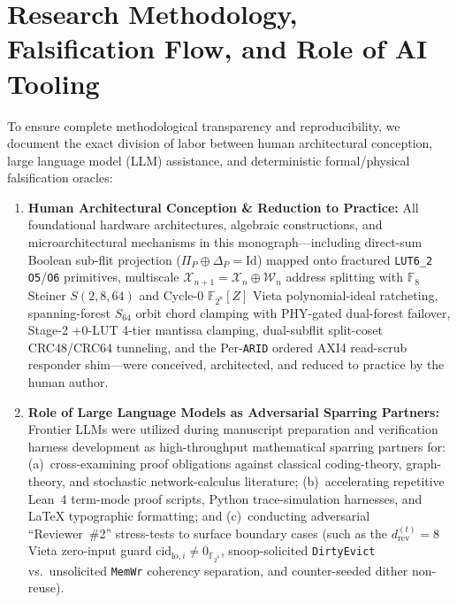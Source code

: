 \documentclass[10pt,twocolumn]{article}
\theoremstyle{spectralthm}
\begin{document}
\section*{Research Methodology, Falsification Flow, and Role of AI Tooling}
To ensure complete methodological transparency and reproducibility, we document the exact division of labor between human architectural conception, large language model (LLM) assistance, and deterministic formal/physical falsification oracles:
\begin{enumerate}
  \item \textbf{Human Architectural Conception \& Reduction to Practice:} All foundational hardware architectures, algebraic constructions, and microarchitectural mechanisms in this monograph---including direct-sum Boolean sub-flit projection ($\Pi_P \oplus \Delta_P = \mathrm{Id}$) mapped onto fractured \mbox{\texttt{LUT6\_2}} \texttt{O5}/\texttt{O6} primitives, multiscale $\mathcal{X}_{n+1} = \mathcal{X}_n \oplus \mathcal{W}_n$ address splitting with $\mathbb{F}_8$ Steiner $S(2,8,64)$ and Cycle-0 $\mathbb{F}_{2^8}[Z]$ Vieta polynomial-ideal ratcheting, spanning-forest $S_{64}$ orbit chord clamping with PHY-gated dual-forest failover, Stage-2 $+0$-LUT 4-tier mantissa clamping, dual-subflit split-coset CRC48/CRC64 tunneling, and the Per-\texttt{ARID} ordered AXI4 read-scrub responder shim---were conceived, architected, and reduced to practice by the human author.
  \item \textbf{Role of Large Language Models as Adversarial Sparring Partners:} Frontier LLMs were utilized during manuscript preparation and verification harness development as high-throughput mathematical sparring partners for: (a)~cross-examining proof obligations against classical coding-theory, graph-theory, and stochastic network-calculus literature; (b)~accelerating repetitive Lean~4 term-mode proof scripts, Python trace-simulation harnesses, and LaTeX typographic formatting; and (c)~conducting adversarial ``Reviewer~\#2'' stress-tests to surface boundary cases (such as the $d_{\mathrm{rev}}^{(t)} = 8$ Vieta zero-input guard $\mathrm{cid}_{\mathrm{lo},i} \neq 0_{\mathbb{F}_{2^8}}$, snoop-solicited \texttt{DirtyEvict} vs.\ unsolicited \texttt{MemWr} coherency separation, and counter-seeded dither non-reuse).

\end{enumerate}
\end{document}
